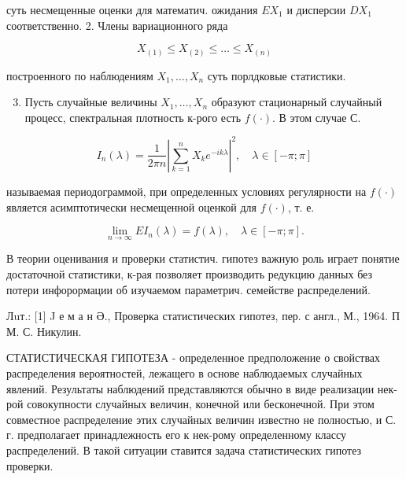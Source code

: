 \documentclass[10pt]{article}
\begin{document}
суть несмещенные оценки для математич. ожидания $E X_{1}$ и дисперсии $D X_{1}$ соответственно. 2. Члены вариационного ряда



\[

X_{(1)} \leqslant X_{(2)} \leqslant \ldots \leqslant X_{(n)}

\]



построенного по наблюдениям $X_{1}, \ldots, X_{n}$ суть порлдковые статистики.



\begin{enumerate}

  \setcounter{enumi}{2}

  \item Пусть случайные величины $X_{1}, \ldots, X_{n}$ образуют стационарный случайный процесс, спектральная плотность к-рого есть $f(\cdot)$. В этом случае С.

\end{enumerate}



\[

I_{n}(\lambda)=\frac{1}{2 \pi n}\left|\sum_{k=1}^{n} X_{k} e^{-i k \lambda}\right|^{2}, \quad \lambda \in[-\pi ; \pi]

\]



называемая периодограммой, при определенных условиях регулярности на $f(\cdot)$ является асимптотически несмещенной оценкой для $f(\cdot)$, т. е.



\[

\lim _{n \rightarrow \infty} E I_{n}(\lambda)=f(\lambda), \quad \lambda \in[-\pi ; \pi] .

\]



В теории оценивания и проверки статистич. гипотез важную роль играет понятие достаточной статистики, к-рая позволяет производить редукцию данных без потери инфорормации об изучаемом параметрич. семействе распределений.



Лuт.: [1] J е м а н Ә., Проверка статистических гипотез, пер. с англ., М., 1964. П М. С. Никулин.



СТАТИСТИЧЕСКАЯ ГИПОТЕЗА - определенное предположение о свойствах распределения вероятностей, лежащего в основе наблюдаемых случайных явлений. Результаты наблюдений представляются обычно в виде реализации нек-рой совокупности случайных величин, конечной или бесконечной. При этом совместное распределение этих случайных величин известно не полностью, и С. г. предполагает принадлежность его к нек-рому определенному классу распределений. В такой ситуации ставится задача статистических гипотез проверки.
\end{document}
